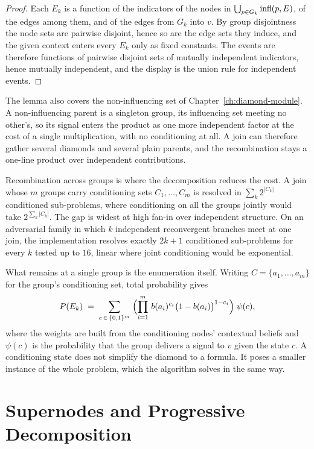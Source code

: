 \documentclass[12pt]{report}
\begin{document}
\begin{proof}
Each $E_k$ is a function of the indicators of the nodes in $\bigcup_{p \in G_k} \mathrm{infl}(p, E)$, of the edges among them, and of the edges from $G_k$ into $v$. By group disjointness the node sets are pairwise disjoint, hence so are the edge sets they induce, and the given context enters every $E_k$ only as fixed constants. The events are therefore functions of pairwise disjoint sets of mutually independent indicators, hence mutually independent, and the display is the union rule for independent events.
\end{proof}

The lemma also covers the non-influencing set of Chapter~\ref{ch:diamond-module}. A non-influencing parent is a singleton group, its influencing set meeting no other's, so its signal enters the product as one more independent factor at the cost of a single multiplication, with no conditioning at all. A join can therefore gather several diamonds and several plain parents, and the recombination stays a one-line product over independent contributions.

Recombination across groups is where the decomposition reduces the cost. A join whose $m$ groups carry conditioning sets $C_1, \dots, C_m$ is resolved in $\sum_k 2^{|C_k|}$ conditioned sub-problems, where conditioning on all the groups jointly would take $2^{\sum_k |C_k|}$. The gap is widest at high fan-in over independent structure. On an adversarial family in which $k$ independent reconvergent branches meet at one join, the implementation resolves exactly $2k + 1$ conditioned sub-problems for every $k$ tested up to $16$, linear where joint conditioning would be exponential.

What remains at a single group is the enumeration itself. Writing $C = \{a_1, \dots, a_m\}$ for the group's conditioning set, total probability gives
\begin{equation}
\label{eq:pp-enumeration}
P(E_k) \;=\; \sum_{c \,\in\, \{0,1\}^{m}} \; \Bigl( \prod_{i=1}^{m} \, b(a_i)^{c_i} \bigl(1 - b(a_i)\bigr)^{1 - c_i} \Bigr) \; \psi(c),
\end{equation}
where the weights are built from the conditioning nodes' contextual beliefs and $\psi(c)$ is the probability that the group delivers a signal to $v$ given the state $c$. A conditioning state does not simplify the diamond to a formula. It poses a smaller instance of the whole problem, which the algorithm solves in the same way.

\section{Supernodes and Progressive Decomposition}
\label{sec:pp-supernodes}
\end{document}
